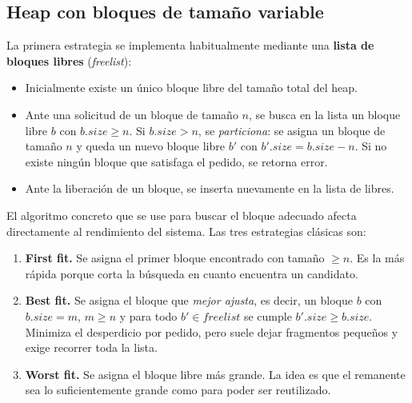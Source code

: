 \documentclass[11pt,a4paper]{article}
\begin{document}
\subsection{Heap con bloques de tamaño variable}

La primera estrategia se implementa habitualmente mediante una
\textbf{lista de bloques libres} (\emph{freelist}):

\begin{itemize}[leftmargin=*]
    \item Inicialmente existe un único bloque libre del tamaño total
        del heap.
    \item Ante una solicitud de un bloque de tamaño $n$, se busca en la
        lista un bloque libre $b$ con $b.\textit{size} \geq n$. Si
        $b.\textit{size} > n$, se \emph{particiona}: se asigna un bloque
        de tamaño $n$ y queda un nuevo bloque libre $b'$ con
        $b'.\textit{size} = b.\textit{size} - n$. Si no existe ningún
        bloque que satisfaga el pedido, se retorna error.
    \item Ante la liberación de un bloque, se inserta nuevamente en la
        lista de libres.
\end{itemize}

El algoritmo concreto que se use para buscar el bloque adecuado
afecta directamente al rendimiento del sistema. Las tres estrategias
clásicas son:

\begin{enumerate}[leftmargin=*]
    \item \textbf{First fit.} Se asigna el primer bloque encontrado con
        tamaño $\geq n$. Es la más rápida porque corta la búsqueda en
        cuanto encuentra un candidato.
    \item \textbf{Best fit.} Se asigna el bloque que \emph{mejor ajusta},
        es decir, un bloque $b$ con
        $b.\textit{size} = m$, $m \geq n$ y para todo $b' \in
        \textit{freelist}$ se cumple
        $b'.\textit{size} \geq b.\textit{size}$. Minimiza el desperdicio
        por pedido, pero suele dejar fragmentos pequeños y exige
        recorrer toda la lista.
    \item \textbf{Worst fit.} Se asigna el bloque libre más grande. La
        idea es que el remanente sea lo suficientemente grande como
        para poder ser reutilizado.
\end{enumerate}
\end{document}
